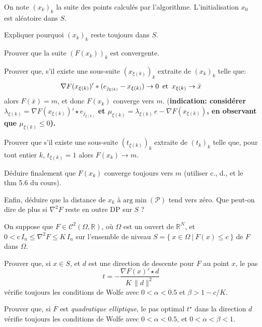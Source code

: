 \documentclass[12pt,a4paper,fleqn]{report}
\newcommand{\R}{\mathbb R}
\newcommand{\grad}{\nabla}
\newcommand{\hess}{\nabla^2}
\renewcommand{\P}{\mathcal P}
\newcommand{\push}[1]{\rule{0pt}{0pt}\hspace{#1pt}}
\begin{document}
\begin{exercice}
\begin{questions}
On note $(x_k)_k$ la suite des points calcul\'es par l'algorithme. L'initialisation $x_0$ est al\'eatoire dans $S$.
\begin{subquestions}
\item Expliquer pourquoi $(x_k)_k$ reste toujours dans $S$.
\item Prouver que la suite $(F(x_k))_k$ est convergente.
\item Prouver que, s'il existe une sous-suite $(x_{\xi(k)})_k$ extraite de $(x_k)_k$ telle que:
\[
\grad F(x_{\xi(k)})'*(e_{j_{\xi(k)}}-x_{\xi(k)})\rightarrow 0 \push{5} \mbox{et}\push{5} x_{\xi(k)}\rightarrow \bar x
\]
 alors $F(\bar x)=m$, et donc $F(x_k)$ converge vers $m$. (\bf indication\rm : consid\'erer $\lambda_{\xi(k)}= \grad F(x_{\xi(k)})'\star e_{j_{\xi(k)}}$ et $\mu_{\xi(k)}=\lambda_{\xi(k)}\,e-\grad F(x_{\xi(k)})$, en observant que $\mu_{\xi(k)}\leq 0$).
\item Prouver que s'il existe une sous-suite $(t_{\xi(k)})_k$ extraite de $(t_k)_k$ telle que, pour tout entier $k$, $t_{\xi(k)}=1$ alors \mbox{$F(x_k)\rightarrow m$}.
\item D\'eduire finalement que $F(x_k)$ converge toujours vers $m$ (utiliser c., d., et le thm 5.6 du cours).
\item Enfin, d\'eduire que la distance de $x_k$ \`a $\mbox{arg} \min (\P)$ tend vers z\'ero. Que peut-on dire de plus si $\hess F$ reste en outre DP sur $S$ ?
\end{subquestions}
\end{questions}
\end{exercice}

\begin{exercice} On suppose que $F\in \mathcal C^2(\Omega,\R)$, o\`u $\Omega$ est un ouvert de $\R^N$, et $0<c\,I_n\leq \hess F\leq K\,I_n$
sur l'ensemble de niveau $S=\{ \ x\in \Omega\ | \ F(x)\leq c\ \}$ de $F$ dans $\Omega$.
\begin{questions}
\item Prouver que, si $x\in S$, et $d$ est une direction de descente pour $F$ au point $x$, le pas
\[
t=-\frac{\grad F(x)'\star d}{K\,\|d\|^2}
\]
v\'erifie toujours les conditions de Wolfe avec $0<\alpha<0.5$ et $\beta>1-c/K$.
\item Prouver que, si $F$ est \textit{quadratique elliptique}, le pas optimal $t^{\star}$ dans la direction $d$ v\'erifie toujours les conditions de Wolfe avec $0<\alpha<0.5$, et $0<\alpha<\beta<1$.
\end{questions}
\end{exercice}
\end{document}

